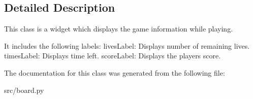 \subsection{Detailed Description}
This class is a widget which displays the game information while playing. 

It includes the following labels\+: lives\+Label\+: Displays number of remaining lives. times\+Label\+: Displays time left. score\+Label\+: Displays the player\textquotesingle{}s score. 

The documentation for this class was generated from the following file\+:\begin{DoxyCompactItemize}
\item 
src/board.\+py\end{DoxyCompactItemize}
